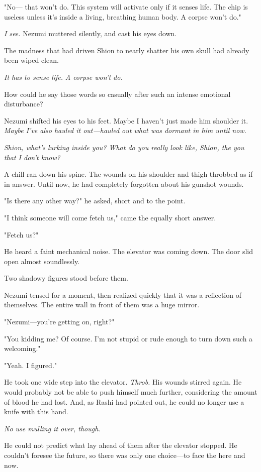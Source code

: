 "No--- that won't do. This system will activate only if it senses life.
The chip is useless unless it's inside a living, breathing human body. A
corpse won't do."

\emph{I see.} Nezumi muttered silently, and cast his eyes down.

The madness that had driven Shion to nearly shatter his own skull had
already been wiped clean.

\emph{It has to sense life.}
\emph{A corpse won't do.}

How could he say those words so casually after such an intense emotional
disturbance?

Nezumi shifted his eyes to his feet. Maybe I haven't just made him
shoulder it. \emph{Maybe I've also hauled it out---hauled out what was dormant
in him until now.}

\emph{Shion, what's lurking inside you? What do you really look like, Shion,
the you that I don't know?}

A chill ran down his spine. The wounds on his shoulder and thigh
throbbed as if in answer. Until now, he had completely forgotten about
his gunshot wounds.

"Is there any other way?" he asked, short and to the point.

"I think someone will come fetch us," came the equally short answer.

"Fetch us?"

He heard a faint mechanical noise. The elevator was coming down. The
door slid open almost soundlessly.

Two shadowy figures stood before them.

Nezumi tensed for a moment, then realized quickly that it was a
reflection of themselves. The entire wall in front of them was a huge
mirror.

"Nezumi---you're getting on, right?"

"You kidding me? Of course. I'm not stupid or rude enough to turn down
such a welcoming."

"Yeah. I figured."

He took one wide step into the elevator. \emph{Throb.} His wounds stirred
again. He would probably not be able to push himself much further,
considering the amount of blood he had lost. And, as Rashi had pointed
out, he could no longer use a knife with this hand.

\emph{No use mulling it over, though.}

He could not predict what lay ahead of them after the elevator stopped.
He couldn't foresee the future, so there was only one choice---to face the
here and now.

